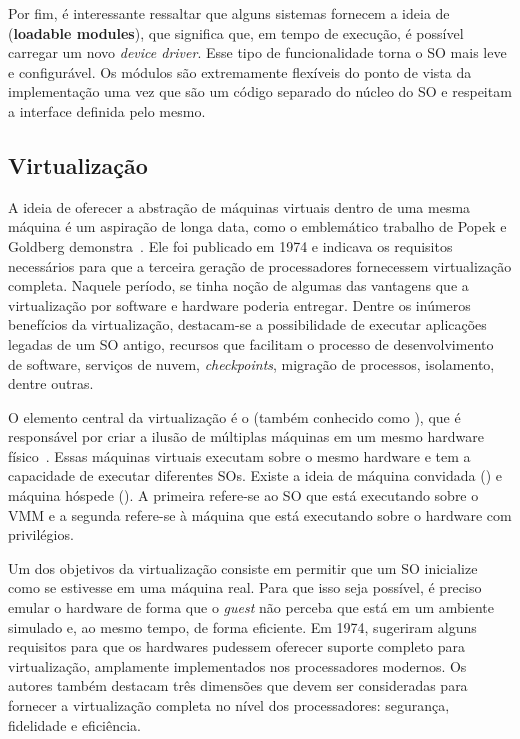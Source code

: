Por fim, é interessante ressaltar que alguns sistemas fornecem a ideia de
 (\textbf{loadable modules}), que significa
que, em tempo de execução, é possível carregar um novo \emph{device driver}. Esse
tipo de funcionalidade torna o SO mais leve e configurável. Os módulos
são extremamente flexíveis do ponto de vista da implementação uma vez que são
um código separado do núcleo do SO e respeitam a interface definida pelo mesmo.

\subsection{Virtualização}
\label{sec:virtualizacao}


A ideia de oferecer a abstração de máquinas virtuais dentro de uma mesma
máquina é um aspiração de longa data, como o emblemático trabalho de Popek e
Goldberg demonstra~\citep{popek}. Ele foi publicado em 1974 e indicava os
requisitos necessários para que a terceira geração de processadores fornecessem
virtualização completa. Naquele período, se tinha noção de algumas das vantagens
que a virtualização por software e hardware poderia entregar. Dentre os
inúmeros benefícios da virtualização, destacam-se a possibilidade de executar
aplicações legadas de um SO antigo, recursos que facilitam o processo de
desenvolvimento de software, serviços de nuvem, \emph{checkpoints}, migração de
processos, isolamento, dentre outras.

O elemento central da virtualização é o  (também
conhecido como ), que é responsável por
criar a ilusão de múltiplas máquinas em um mesmo hardware
físico~\citep{tanenbaum}. Essas máquinas virtuais executam sobre o mesmo hardware
e tem a capacidade de executar diferentes SOs. Existe a ideia de máquina
convidada () e máquina hóspede (). A
primeira refere-se ao SO que está executando sobre o VMM e a segunda refere-se
à máquina que está executando sobre o hardware com privilégios.

Um dos objetivos da virtualização consiste em permitir que um SO inicialize
como se estivesse em uma máquina real. Para que isso seja possível, é preciso
emular o hardware de forma que o \emph{guest} não perceba que está em um
ambiente simulado e, ao mesmo tempo, de forma
eficiente. Em 1974, \citet{popek} sugeriram alguns requisitos para que os
hardwares pudessem oferecer suporte completo para virtualização,
amplamente implementados nos processadores modernos. Os autores também
destacam três dimensões que devem ser consideradas para fornecer a
virtualização completa no nível dos processadores: segurança, fidelidade e
eficiência.


